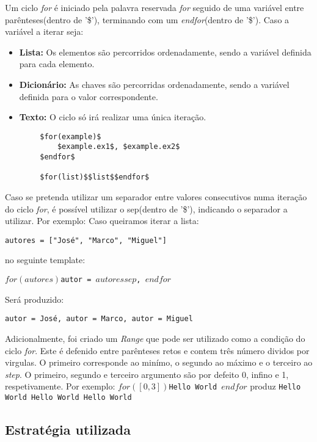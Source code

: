 \documentclass[../relatorio.tex]{subfiles}
\begin{document}
    Um ciclo \textit{for} é iniciado pela palavra reservada \textit{for}
    seguido de uma variável entre parênteses(dentro de '\$'), terminando 
    com um \textit{endfor}(dentro de '\$').
    Caso a variável a iterar seja:
    \begin{itemize}
        \item \textbf{Lista: }Os elementos são percorridos ordenadamente,
        sendo a variável definida para cada elemento.
        \item \textbf{Dicionário: }As chaves são percorridas ordenadamente,
        sendo a variável definida para o valor correspondente. 
        \item \textbf{Texto: }O ciclo só irá realizar uma única iteração.
    \end{itemize}

    \begin{verbatim}
        $for(example)$
            $example.ex1$, $example.ex2$
        $endfor$

        $for(list)$$list$$endfor$
    \end{verbatim}

    Caso se pretenda utilizar um separador entre valores consecutivos numa
    iteração do ciclo \textit{for}, é possível utilizar o sep(dentro de '\$'),
    indicando o separador a utilizar. Por exemplo:
    Caso queiramos iterar a lista:

    \texttt{autores = ["José", "Marco", "Miguel"]}

    no seguinte template:

    \texttt{$for(autores)$autor = $autores$$sep$, $endfor$}

    Será produzido:

    \texttt{autor = José, autor = Marco, autor = Miguel}

    Adicionalmente, foi criado um \textit{Range} que pode ser utilizado como a
    condição do ciclo \textit{for}. Este é defenido entre parênteses retos e 
    contem três número dividos por virgulas. O primeiro corresponde ao minímo, o segundo
    ao máximo e o terceiro ao \textit{step}. O primeiro, segundo e terceiro argumento são
    por defeito 0, infino e 1, respetivamente.
    Por exemplo:
    \texttt{$for([0, 3])$Hello World $endfor$}
    produz
    \texttt{Hello World Hello World Hello World }

    \subsection{Estratégia utilizada}
\end{document}
